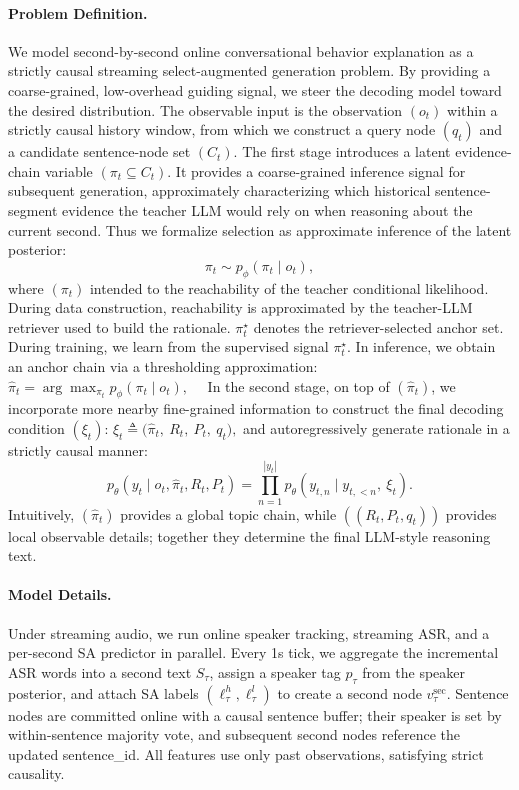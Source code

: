 \paragraph{Problem Definition.}
We model second-by-second online conversational behavior explanation as a strictly causal streaming select-augmented generation problem. By providing a coarse-grained, low-overhead guiding signal, we steer the decoding model toward the desired distribution. The observable input is the observation $(o_t)$ within a strictly causal history window, from which we construct a query node $(q_t)$ and a candidate sentence-node set $(C_t)$. The first stage introduces a latent evidence-chain variable $(\pi_t \subseteq C_t)$. It provides a coarse-grained inference signal for subsequent generation, approximately characterizing which historical sentence-segment evidence the teacher LLM would rely on when reasoning about the current second. Thus we formalize selection as approximate inference of the latent posterior:
\[
\pi_t \sim p_\phi(\pi_t \mid o_t),
\]
where $(\pi_t)$ intended to the reachability of the teacher conditional likelihood. During data construction, reachability is approximated by the teacher-LLM retriever used to build the rationale. $\pi_t^\star$ denotes the retriever-selected anchor set. During training, we learn from the supervised signal $\pi_t^\star$. In inference, we obtain an anchor chain via a thresholding approximation:
\(\hat{\pi}_t = \arg\max_{\pi_t} p_\phi(\pi_t\mid o_t), \quad\)
In the second stage, on top of \((\hat{\pi}_t)\), we incorporate more nearby fine-grained information to construct the final decoding condition \((\xi_t)\):
\(\xi_t \triangleq \big(\hat{\pi}_t,\ R_t,\ P_t,\ q_t\big),\)
and autoregressively generate rationale in a strictly causal manner:
\[
p_\theta(y_t\mid o_t,\hat{\pi}_t, R_t, P_t) = \prod_{n=1}^{|y_t|} p_\theta\!\left(y_{t,n}\mid y_{t,<n},\ \xi_t\right).
\]
Intuitively, $(\hat{\pi}_t)$ provides a global topic chain, while $((R_t,P_t,q_t))$ provides local observable details; together they determine the final LLM-style reasoning text.
\paragraph{Model Details.}
Under streaming audio, we run online speaker tracking, streaming ASR, and a per-second SA predictor in parallel. Every 1s tick, we aggregate the incremental ASR words into a second text $S_\tau$, assign a speaker tag $p_\tau$ from the speaker posterior, and attach SA labels $(\ell_\tau^{h},\ell_\tau^{l})$ to create a second node $v_\tau^{\mathrm{sec}}$. Sentence nodes are committed online with a causal sentence buffer; their speaker is set by within-sentence majority vote, and subsequent second nodes reference the updated sentence\_id. All features use only past observations, satisfying strict causality.

